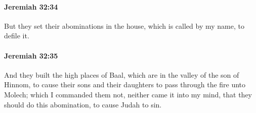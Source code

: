 		\paragraph{Jeremiah 32:34} %
			\label{JEREMIAH-32-34}

			But they set their abominations in the house, which is called by my name, to defile it.


		\paragraph{Jeremiah 32:35} %
			\label{JEREMIAH-32-35}

			And they built the high places of Baal, which are in the valley of the son of Hinnom, to cause their sons and their daughters to pass through the fire unto Molech; which I commanded them not, neither came it into my mind, that they should do this abomination, to cause Judah to sin.


